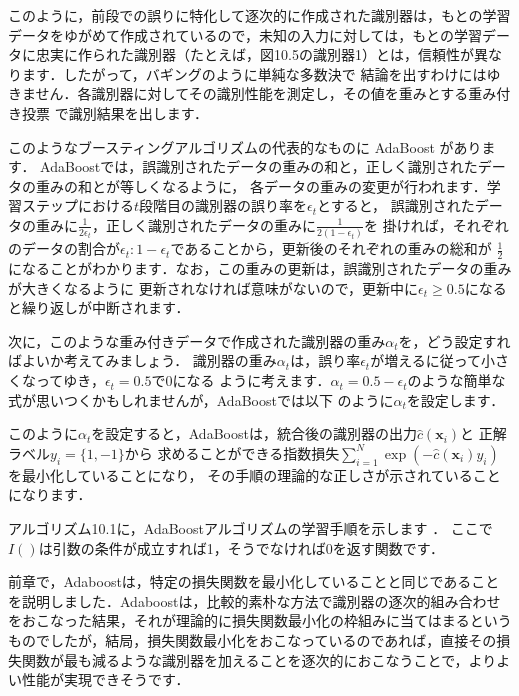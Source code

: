 このように，前段での誤りに特化して逐次的に作成された識別器は，もとの学習データをゆがめて作成されているので，未知の入力に対しては，もとの学習データに忠実に作られた識別器（たとえば，図10.5の識別器1）とは，信頼性が異なります．したがって，バギングのように単純な多数決で
結論を出すわけにはゆきません．各識別器に対してその識別性能を測定し，その値を重みとする重み付き投票
で識別結果を出します．


このようなブースティングアルゴリズムの代表的なものに
AdaBoost
があります．
AdaBoostでは，誤識別されたデータの重みの和と，正しく識別されたデータの重みの和とが等しくなるように，
各データの重みの変更が行われます．学習ステップにおける$t$段階目の識別器の誤り率を$\epsilon_t$とすると，
誤識別されたデータの重みに$\frac{1}{2\epsilon_t}$，正しく識別されたデータの重みに$\frac{1}{2(1-\epsilon_t)}$を
掛ければ，それぞれのデータの割合が$\epsilon_t:1-\epsilon_t$であることから，更新後のそれぞれの重みの総和が
$\frac{1}{2}$になることがわかります．なお，この重みの更新は，誤識別されたデータの重みが大きくなるように
更新されなければ意味がないので，更新中に$\epsilon_t \ge 0.5$になると繰り返しが中断されます．


次に，このような重み付きデータで作成された識別器の重み$\alpha_t$を，どう設定すればよいか考えてみましょう．
識別器の重み$\alpha_t$は，誤り率$\epsilon_t$が増えるに従って小さくなってゆき，$\epsilon_t=0.5$で$0$になる
ように考えます．$\alpha_t = 0.5-\epsilon_t$のような簡単な式が思いつくかもしれませんが，AdaBoostでは以下
のように$\alpha_t$を設定します．


このように$\alpha_t$を設定すると，AdaBoostは，統合後の識別器の出力$\hat{c}(\bm{x}_i)$と
正解ラベル$y_i=\{1,-1\}$から
求めることができる指数損失$\sum_{i=1}^{N}\exp(-\hat{c}(\bm{x}_i) y_i)$を最小化していることになり，
その手順の理論的な正しさが示されていることになります．

アルゴリズム10.1に，AdaBoostアルゴリズムの学習手順を示します
．
ここで$I( )$は引数の条件が成立すれば1，そうでなければ0を返す関数です．





前章で，Adaboostは，特定の損失関数を最小化していることと同じであることを説明しました．Adaboostは，比較的素朴な方法で識別器の逐次的組み合わせをおこなった結果，それが理論的に損失関数最小化の枠組みに当てはまるというものでしたが，結局，損失関数最小化をおこなっているのであれば，直接その損失関数が最も減るような識別器を加えることを逐次的におこなうことで，よりよい性能が実現できそうです．

